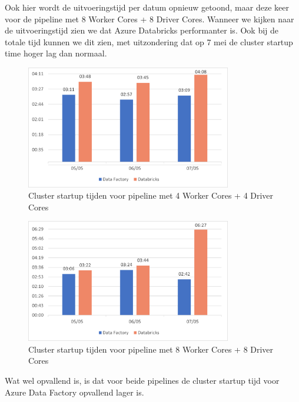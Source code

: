Ook hier wordt de uitvoeringstijd per datum opnieuw getoond, maar deze keer voor de pipeline met 8 Worker Cores + 8 Driver Cores. Wanneer we kijken naar de uitvoeringstijd zien we dat Azure Databricks performanter is. Ook bij de totale tijd kunnen we dit zien, met uitzondering dat op 7 mei de cluster startup time hoger lag dan normaal. 

\begin{figure}[H]
    \centering
    \includegraphics[width=0.8\textwidth]{./graphics/kosten/graf5.png}
    \caption{Cluster startup tijden voor pipeline met 4 Worker Cores + 4 Driver Cores}
\end{figure}

\begin{figure}[H]
    \centering
    \includegraphics[width=0.8\textwidth]{./graphics/kosten/graf6.png}
    \caption{Cluster startup tijden voor pipeline met 8 Worker Cores + 8 Driver Cores}
\end{figure}

Wat wel opvallend is, is dat voor beide pipelines de cluster startup tijd voor Azure Data Factory opvallend lager is.